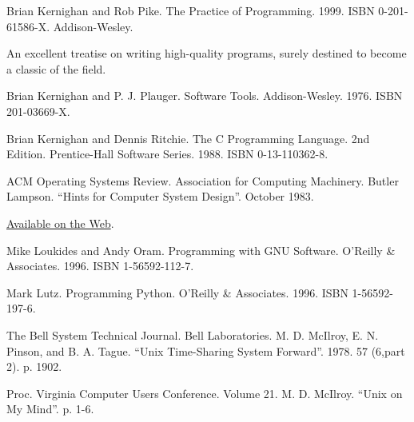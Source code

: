 \documentclass[12pt,oneside]{book}
\begin{document}
\begin{common-format}
\begin{thebibliography}{9}
 Brian Kernighan and Rob Pike. The Practice of Programming. 1999. ISBN 0-201-61586-X. Addison-Wesley.

An excellent treatise on writing high-quality programs, surely destined to become a classic of the field.

 Brian Kernighan and P. J. Plauger. Software Tools. Addison-Wesley. 1976. ISBN 201-03669-X.

 Brian Kernighan and Dennis Ritchie. The C Programming Language. 2nd Edition. Prentice-Hall Software Series. 1988. ISBN 0-13-110362-8.

 ACM Operating Systems Review. Association for Computing Machinery. Butler Lampson. “Hints for Computer System Design”. October 1983.

\href{http://research.microsoft.com/~lampson/33-Hints/WebPage.html}{Available on the Web}.

%
%
%
%
%
%
%
%
%
%
 Mike Loukides and Andy Oram. Programming with GNU Software. O'Reilly \&{} Associates. 1996. ISBN 1-56592-112-7.

 Mark Lutz. Programming Python. O'Reilly \&{} Associates. 1996. ISBN 1-56592-197-6.

 The Bell System Technical Journal. Bell Laboratories. M. D. McIlroy, E. N. Pinson, and B. A. Tague. “Unix Time-Sharing System Forward”. 1978. 57 (6,part 2). p. 1902.

 Proc. Virginia Computer Users Conference. Volume 21. M. D. McIlroy. “Unix on My Mind”. p. 1-6.


\end{thebibliography}
\end{common-format}
\end{document}
